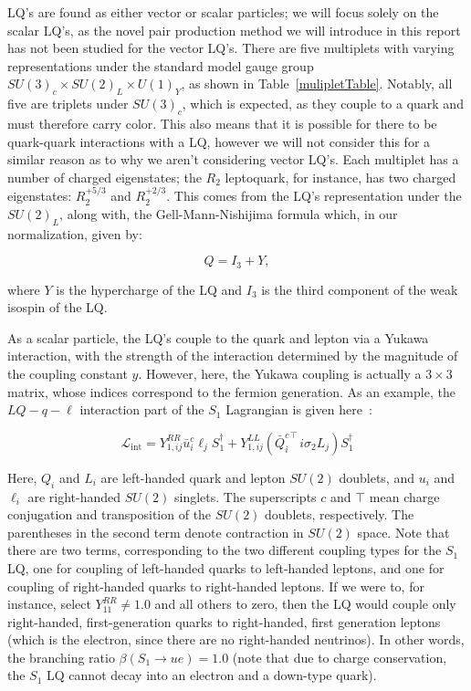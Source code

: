     LQ's are found as either vector or scalar particles; we will focus solely on the scalar LQ's, as the novel pair production method we will introduce in this report has not been studied for the vector LQ's. There are five multiplets with varying representations under the standard model gauge group $SU(3)_c \times SU(2)_L \times U(1)_Y$, as shown in Table~\ref{mulipletTable}. Notably, all five are triplets under $SU(3)_c$, which is expected, as they couple to a quark and must therefore carry color. This also means that it is possible for there to be quark-quark interactions with a LQ, however we will not consider this for a similar reason as to why we aren't considering vector LQ's. Each multiplet has a number of charged eigenstates; the $R_2$ leptoquark, for instance, has two charged eigenstates: $R_2^{+5/3}$ and $R_2^{+2/3}$. This comes from the LQ's representation under the $SU(2)_L$, along with, the Gell-Mann-Nishijima formula which, in our normalization, given by:

    \begin{equation}
        Q = I_3 + Y,
    \end{equation}

    where $Y$ is the hypercharge of the LQ and $I_3$ is the third component of the weak isospin of the LQ.

    As a scalar particle, the LQ's couple to the quark and lepton via a Yukawa interaction, with the strength of the interaction determined by the magnitude of the coupling constant $y$. However, here, the Yukawa coupling is actually a $3\times3$ matrix, whose indices correspond to the fermion generation. As an example, the $LQ-q-\ell$ interaction part of the $S_1$ Lagrangian is given here~\cite{Crivellin_2022}:

    \begin{equation}
        \mathcal{L}_{\text{int}} = Y_{1,ij}^{RR} \bar{u}_i^c \ell_j S_1^{\dagger} + Y_{1,ij}^{LL} \left(\bar{Q}_i^{c\intercal} i\sigma_2 L_j \right) S_1^{\dagger}
    \end{equation}

    Here, $Q_i$ and $L_i$ are left-handed quark and lepton $SU(2)$ doublets, and $u_i$ and $\ell_i$ are right-handed $SU(2)$ singlets. The superscripts $c$ and $\intercal$ mean charge conjugation and transposition of the $SU(2)$ doublets, respectively. The parentheses in the second term denote contraction in $SU(2)$ space. Note that there are two terms, corresponding to the two different coupling types for the $S_1$ LQ, one for coupling of left-handed quarks to left-handed leptons, and one for coupling of right-handed quarks to right-handed leptons. If we were to, for instance, select $Y^{RR}_{11} \neq 1.0$ and all others to zero, then the LQ would couple only right-handed, first-generation quarks to right-handed, first generation leptons (which is the electron, since there are no right-handed neutrinos). In other words, the branching ratio $\beta(S_1 \rightarrow ue)=1.0$ (note that due to charge conservation, the $S_1$ LQ cannot decay into an electron and a down-type quark).


